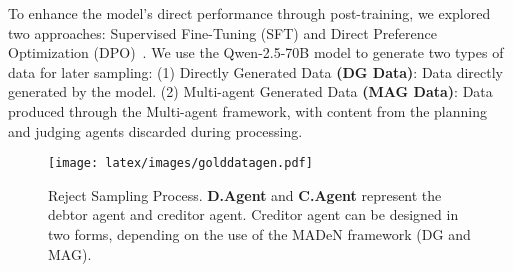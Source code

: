 To enhance the model’s direct performance through post-training, we explored two approaches: Supervised Fine-Tuning (SFT) and Direct Preference Optimization (DPO)~\citep{rafailov2024directpreferenceoptimizationlanguage}. We use the Qwen-2.5-70B model to generate two types of data for later sampling: (1) Directly Generated Data \textbf{(DG Data)}: Data directly generated by the model. (2) Multi-agent Generated Data \textbf{(MAG Data)}: Data produced through the Multi-agent framework, with content from the planning and judging agents discarded during processing.

 
\begin{figure*}[htbp]
\vspace{-0.1in}
  \centering
  \texttt{[image: latex/images/golddatagen.pdf]}  
  
  \caption{Reject Sampling Process. \textbf{D.Agent} and \textbf{C.Agent} represent the debtor agent and creditor agent. Creditor agent can be designed in two forms, depending on the use of the MADeN framework (DG and MAG).}
\vspace{-0.1in}
\label{img:sampling}
\end{figure*}

